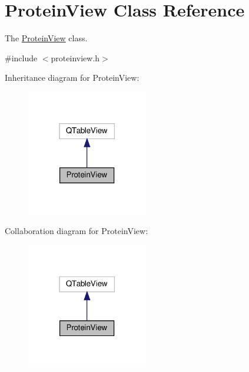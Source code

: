\hypertarget{class_protein_view}{}\section{Protein\+View Class Reference}
\label{class_protein_view}


The \mbox{\hyperlink{class_protein_view}{Protein\+View}} class.  




{\ttfamily \#include $<$proteinview.\+h$>$}



Inheritance diagram for Protein\+View\+:\nopagebreak
\begin{figure}[H]
\begin{center}
\leavevmode
\includegraphics[width=150pt]{class_protein_view__inherit__graph}
\end{center}
\end{figure}


Collaboration diagram for Protein\+View\+:\nopagebreak
\begin{figure}[H]
\begin{center}
\leavevmode
\includegraphics[width=150pt]{class_protein_view__coll__graph}
\end{center}
\end{figure}
